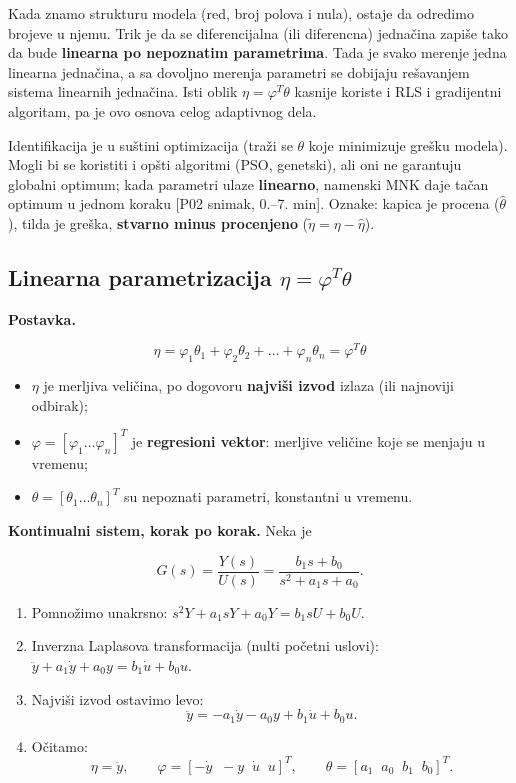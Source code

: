 \documentclass[11pt,a4paper,parskip=half,headsepline,numbers=noenddot]{scrartcl}
\DeclareRobustCommand{\izvor}[1]{{\small\color{izvorC}[#1]}}
\begin{document}
Kada znamo strukturu modela (red, broj polova i nula), ostaje da odredimo brojeve u njemu. Trik je da se diferencijalna (ili diferencna) jednačina zapiše tako da bude \textbf{linearna po nepoznatim parametrima}. Tada je svako merenje jedna linearna jednačina, a sa dovoljno merenja parametri se dobijaju rešavanjem sistema linearnih jednačina. Isti oblik \(\eta = \varphi^T\theta\) kasnije koriste i RLS i gradijentni algoritam, pa je ovo osnova celog adaptivnog dela.

Identifikacija je u suštini optimizacija (traži se \(\theta\) koje minimizuje grešku modela). Mogli bi se koristiti i opšti algoritmi (PSO, genetski), ali oni ne garantuju globalni optimum; kada parametri ulaze \textbf{linearno}, namenski MNK daje tačan optimum u jednom koraku \izvor{P02 snimak, 0.--7. min}. Oznake: kapica je procena (\(\hat\theta\)), tilda je greška, \textbf{stvarno minus procenjeno} (\(\tilde\eta = \eta - \hat\eta\)).

\subsection{\texorpdfstring{Linearna parametrizacija \(\eta = \varphi^T\theta\)}{Linearna parametrizacija \textbackslash eta = \textbackslash varphi\^{}T\textbackslash theta}}

\textbf{Postavka.}

\[\eta = \varphi_1\theta_1 + \varphi_2\theta_2 + \dots + \varphi_n\theta_n = \varphi^T\theta\]

\begin{itemize}
\item \(\eta\) je merljiva veličina, po dogovoru \textbf{najviši izvod} izlaza (ili najnoviji odbirak);
\item \(\varphi = [\varphi_1 \dots \varphi_n]^T\) je \textbf{regresioni vektor}: merljive veličine koje se menjaju u vremenu;
\item \(\theta = [\theta_1 \dots \theta_n]^T\) su nepoznati parametri, konstantni u vremenu.
\end{itemize}

\textbf{Kontinualni sistem, korak po korak.} Neka je

\[G(s) = \frac{Y(s)}{U(s)} = \frac{b_1 s + b_0}{s^2 + a_1 s + a_0}.\]

\begin{enumerate}
\def\labelenumi{\arabic{enumi}.}
\item Pomnožimo unakrsno: \(s^2Y + a_1 sY + a_0 Y = b_1 sU + b_0 U\).
\item Inverzna Laplasova transformacija (nulti početni uslovi): \(\ddot y + a_1\dot y + a_0 y = b_1\dot u + b_0 u\).
\item Najviši izvod ostavimo levo:
  \[\ddot y = -a_1\dot y - a_0 y + b_1\dot u + b_0 u .\]
\item Očitamo:
  \[\eta = \ddot y,\qquad \varphi = [-\dot y\;\; -y\;\; \dot u\;\; u]^T,\qquad \theta = [a_1\;\; a_0\;\; b_1\;\; b_0]^T .\]
\end{enumerate}
\end{document}
